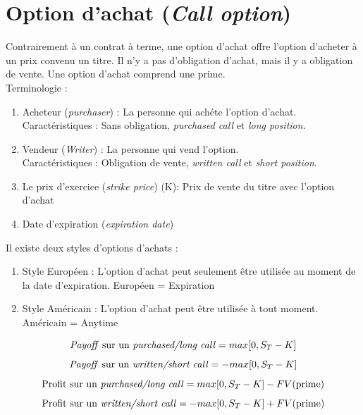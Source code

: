 \documentclass[11pt,french]{report}
\begin{document}

\chapter{Option d'achat (\emph{Call option})}
\label{chap: call options}

Contrairement à un contrat à terme, une option d'achat offre l'option d'acheter à un prix convenu un titre. Il n'y a pas d'obligation d'achat, mais il y a obligation de vente. Une option d'achat comprend une prime.
\\ Terminologie :
\begin{enumerate}
\item Acheteur (\emph{purchaser}) : La personne qui achéte l'option d'achat. 
\\Caractéristiques : Sans obligation, \emph{purchased call} et \emph{long position}.
\item Vendeur (\emph{Writer}) : La personne qui vend l'option.
\\Caractéristiques : Obligation de vente, \emph{written call} et \emph{short position}.
\item Le prix d'exercice (\emph{strike price}) (K): Prix de vente du titre avec l'option d'achat
\item Date d'expiration (\emph{expiration date})
\end{enumerate}
Il existe deux styles d'options d'achats :
\begin{enumerate}
\item Style Européen : L'option d'achat peut seulement être utilisée au moment de la date d'expiration. Européen = Expiration
\item Style Américain : L'option d'achat peut être utilisée à tout moment. Américain = Anytime
\end{enumerate}
\begin{equation}
\label{eq:chap:12:payoff long call}
\text{\emph{Payoff} sur un \emph{purchased/long call}} = max[0, S_T - K]
\end{equation}
\begin{equation}
\label{eq:chap:12:payoff short call}
\text{\emph{Payoff} sur un \emph{written/short call}} = - max[0, S_T - K]
\end{equation}
\begin{equation}
\text{Profit sur un \emph{purchased/long call}} = max[0, S_T - K] - FV(\text{prime})
\end{equation}
\begin{equation}
\text{Profit sur un \emph{written/short call}} = - max[0, S_T - K] + FV(\text{prime})
\end{equation}
\end{document}
